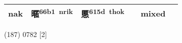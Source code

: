 \documentclass[14pt,a4paper]{scrartcl}
\begin{document}
\begin{longtable}[c]{@{}llllll@{}}
\begin{minipage}[t]{0.14\columnwidth}
nak
\strut\end{minipage} &
\begin{minipage}[t]{0.14\columnwidth}\raggedright\strut
暱\textsuperscript{66b1~nrik}
\strut\end{minipage} &
\begin{minipage}[t]{0.14\columnwidth}\raggedright\strut
慝\textsuperscript{615d~thok}
\strut\end{minipage} &
\begin{minipage}[t]{0.14\columnwidth}\raggedright\strut
\strut\end{minipage} &
\begin{minipage}[t]{0.14\columnwidth}\raggedright\strut
mixed
\strut\end{minipage}\tabularnewline
\bottomrule
\end{longtable}

(187) 0782 {[}2{]}
\end{document}
